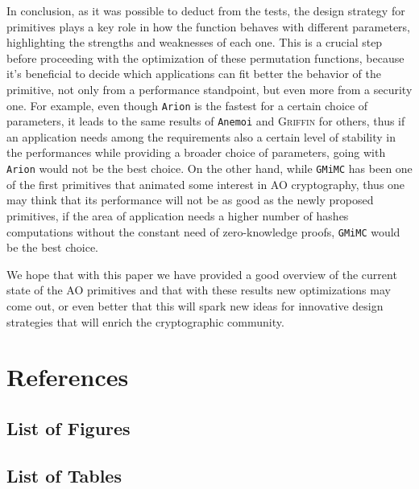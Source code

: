 \documentclass[12pt, a4paper]{report}
\begin{document}
In conclusion, as it was possible to deduct from the tests, the design strategy for primitives plays a key role in how the function behaves with different parameters, highlighting the strengths and weaknesses of each one.
This is a crucial step before proceeding with the optimization of these permutation functions, because it's beneficial to decide which applications can fit better the behavior of the primitive, not only from a performance standpoint, but even more from a security one.
For example, even though \texttt{Arion} is the fastest for a certain choice of parameters, it leads to the same results of \texttt{Anemoi} and \textsc{Griffin} for others, thus if an application needs among the requirements also a certain level of stability in the performances while providing a broader choice of parameters, going with \texttt{Arion} would not be the best choice.
On the other hand, while \texttt{GMiMC} has been one of the first primitives that animated some interest in AO cryptography, thus one may think that its performance will not be as good as the newly proposed primitives, if the area of application needs a higher number of hashes computations without the constant need of zero-knowledge proofs, \texttt{GMiMC} would be the best choice.

We hope that with this paper we have provided a good overview of the current state of the AO primitives and that with these results new optimizations may come out, or even better that this will spark new ideas for innovative design strategies that will enrich the cryptographic community.

\chapter{References}

\nocite{*}
\printbibliography[heading=subbibnumbered, title={Bibliography}]

\newpage
\section{List of Figures}\label{sec:listoffigures}
\listoffigures

\newpage
\section{List of Tables}\label{sec:listoftables}
\listoftables
\end{document}
